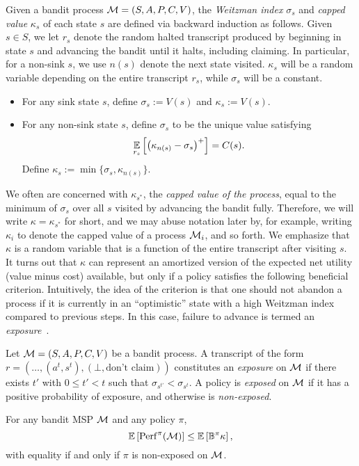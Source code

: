 Given a bandit process $\mathcal{M} = (S,A,P,C,V)$, the \emph{Weitzman index} $\sigma_s$ and \emph{capped value} $\kappa_s$ of each state $s$ are defined via backward induction as follows.
Given $s \in S$, we let $r_s$ denote the random halted transcript produced by beginning in state $s$ and advancing the bandit until it halts, including claiming.
In particular, for a non-sink $s$, we use $n(s)$ denote the next state visited.
$\kappa_s$ will be a random variable depending on the entire transcript $r_s$, while $\sigma_s$ will be a constant.
\begin{itemize}
	\item For any sink state $s$, define $\sigma_s := V(s)$ and $\kappa_s := V(s)$.
	\item For any non-sink state $s$, define $\sigma_s$ to be the unique value satisfying
	\[ \operatorname*{\mathbb{E}}_{r_s} \left[ \left(\kappa_{n(s)} - \sigma_s\right)^+ \right] = C(s) . \]
	Define $\kappa_s := \min \{ \sigma_s, \kappa_{n(s)} \}$.
\end{itemize}
We often are concerned with $\kappa_{s^*}$, the \emph{capped value of the process}, equal to the minimum of $\sigma_s$ over all $s$ visited by advancing the bandit fully.
Therefore, we will write $\kappa = \kappa_{s^*}$ for short, and we may abuse notation later by, for example, writing $\kappa_i$ to denote the capped value of a process $\mathcal{M}_i$, and so forth.
We emphasize that $\kappa$ is a random variable that is a function of the entire transcript after visiting $s$.
It turns out that $\kappa$ can represent an amortized version of the expected net utility (value minus cost) available, but only if a policy satisfies the following beneficial criterion.
Intuitively, the idea of the criterion is that one should not abandon a process if it is currently in an ``optimistic'' state with a high Weitzman index compared to previous steps.
In this case, failure to advance is termed an \emph{exposure}~\citep{kleinberg2016descending}.


\begin{definition} \label{def:exposed}
	Let $\mathcal{M} = (S,A,P,C,V)$ be a bandit process.
	A transcript of the form $r = (\dots,(a^t,s^t),(\bot,\text{don't claim}))$ constitutes an \emph{exposure} on $\mathcal{M}$ if there exists $t'$ with $0 \leq t' < t$ such that $\sigma_{s^{t'}} < \sigma_{s^t}$.
	A policy is \emph{exposed} on $\mathcal{M}$ if it has a positive probability of exposure, and otherwise is \emph{non-exposed}.
\end{definition}

\begin{lemma} \label{lemma:magic-multistage}
	For any bandit MSP $\mathcal{M}$ and any policy $\pi$,
	\[ \operatorname*{\mathbb{E}} \left[ \mathrm{Perf}^{\pi}(\mathcal{M}) \right] \leq \operatorname*{\mathbb{E}} \left[ \mathbb{B}^{\pi} \kappa \right] , \]
	with equality if and only if $\pi$ is non-exposed on $\mathcal{M}$.
\end{lemma}

